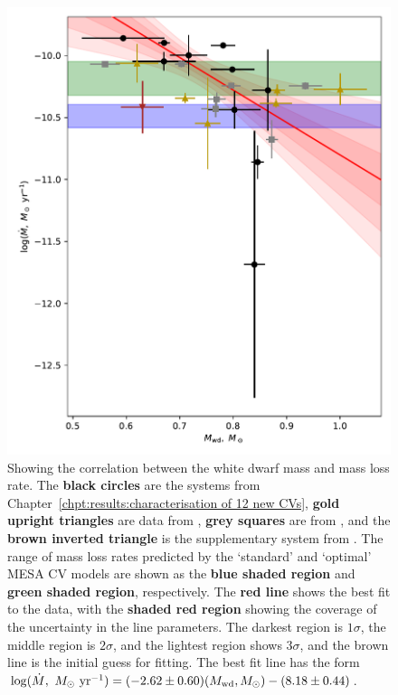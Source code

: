 \begin{figure}
    \centering
    \includegraphics[width=\textwidth]{figures/results/Mdot/Mwd_Mdot.pdf}
    \caption{Showing the correlation between the white dwarf mass and mass loss rate. The {\bf black circles} are the systems from Chapter~\ref{chpt:results:characterisation of 12 new CVs}, {\bf gold upright triangles} are data from \citet{McAllister2019}, {\bf grey squares} are from \citet{Savoury2011}, and the {\bf brown inverted triangle} is the supplementary system from \citet{mcallister2017b}. The range of mass loss rates predicted by the `standard' and `optimal' MESA CV models are shown as the {\bf blue shaded region} and {\bf green shaded region}, respectively. The {\bf red line} shows the best fit to the data, with the {\bf shaded red region} showing the coverage of the uncertainty in the line parameters. The darkest region is $1\sigma$, the middle region is $2\sigma$, and the lightest region shows $3\sigma$, and the {\rm brown line} is the initial guess for fitting. The best fit line has the form $\log ( \dot M,\ M_\odot\ {\rm yr}^{-1}) = (-2.62 \pm 0.60) (M_{\rm wd}, M_\odot) - (8.18 \pm 0.44)$.}
    \label{fig:massloss and AML:white dwarf mass vs Mdot fit}
\end{figure}
